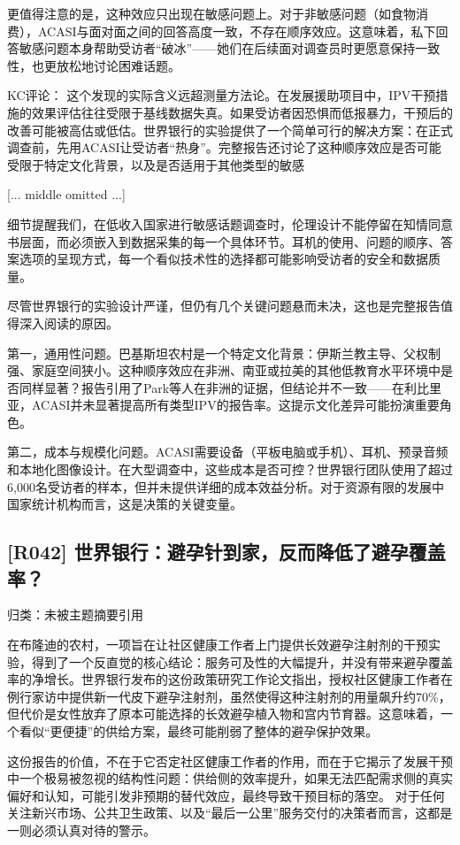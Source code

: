 \documentclass[11pt]{ctexart}
\begin{document}
更值得注意的是，这种效应只出现在敏感问题上。对于非敏感问题（如食物消费），ACASI与面对面之间的回答高度一致，不存在顺序效应。这意味着，私下回答敏感问题本身帮助受访者“破冰”——她们在后续面对调查员时更愿意保持一致性，也更放松地讨论困难话题。

KC评论： 这个发现的实际含义远超测量方法论。在发展援助项目中，IPV干预措施的效果评估往往受限于基线数据失真。如果受访者因恐惧而低报暴力，干预后的改善可能被高估或低估。世界银行的实验提供了一个简单可行的解决方案：在正式调查前，先用ACASI让受访者“热身”。完整报告还讨论了这种顺序效应是否可能受限于特定文化背景，以及是否适用于其他类型的敏感

[... middle omitted ...]

细节提醒我们，在低收入国家进行敏感话题调查时，伦理设计不能停留在知情同意书层面，而必须嵌入到数据采集的每一个具体环节。耳机的使用、问题的顺序、答案选项的呈现方式，每一个看似技术性的选择都可能影响受访者的安全和数据质量。

尽管世界银行的实验设计严谨，但仍有几个关键问题悬而未决，这也是完整报告值得深入阅读的原因。

第一，通用性问题。巴基斯坦农村是一个特定文化背景：伊斯兰教主导、父权制强、家庭空间狭小。这种顺序效应在非洲、南亚或拉美的其他低教育水平环境中是否同样显著？报告引用了Park等人在非洲的证据，但结论并不一致——在利比里亚，ACASI并未显著提高所有类型IPV的报告率。这提示文化差异可能扮演重要角色。

第二，成本与规模化问题。ACASI需要设备（平板电脑或手机）、耳机、预录音频和本地化图像设计。在大型调查中，这些成本是否可控？世界银行团队使用了超过6,000名受访者的样本，但并未提供详细的成本效益分析。对于资源有限的发展中国家统计机构而言，这是决策的关键变量。

\subsection{[R042] 世界银行：避孕针到家，反而降低了避孕覆盖率？}
{\small\color{refgray}归类：未被主题摘要引用}

在布隆迪的农村，一项旨在让社区健康工作者上门提供长效避孕注射剂的干预实验，得到了一个反直觉的核心结论：服务可及性的大幅提升，并没有带来避孕覆盖率的净增长。世界银行发布的这份政策研究工作论文指出，授权社区健康工作者在例行家访中提供新一代皮下避孕注射剂，虽然使得这种注射剂的用量飙升约70\%，但代价是女性放弃了原本可能选择的长效避孕植入物和宫内节育器。这意味着，一个看似“更便捷”的供给方案，最终可能削弱了整体的避孕保护效果。

这份报告的价值，不在于它否定社区健康工作者的作用，而在于它揭示了发展干预中一个极易被忽视的结构性问题：供给侧的效率提升，如果无法匹配需求侧的真实偏好和认知，可能引发非预期的替代效应，最终导致干预目标的落空。 对于任何关注新兴市场、公共卫生政策、以及“最后一公里”服务交付的决策者而言，这都是一则必须认真对待的警示。
\end{document}
